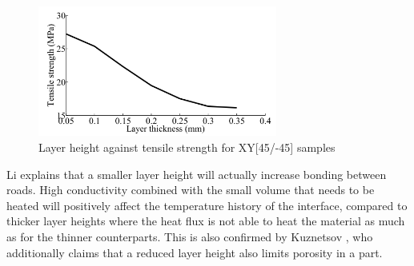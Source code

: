 
\begin{figure}[htb]
    \centering
    \includegraphics[width=0.70\textwidth]{chapter_2/figures/Layerheight.PNG}
    \caption{Layer height against tensile strength for XY[45/-45] samples \cite{Li2017TheProperties}}
    \label{fig:Layerheigth}
\end{figure}

Li \cite{Li2017TheProperties} explains that a smaller layer height will actually increase bonding between roads. High conductivity combined with the small volume that needs to be heated will positively affect the temperature history of the interface, compared to thicker layer heights where the heat flux is not able to heat the material as much as for the thinner counterparts. This is also confirmed by Kuznetsov \cite{Kuznetsov2018StrengthProcess}, who additionally claims that a reduced layer height also limits porosity in a part.

